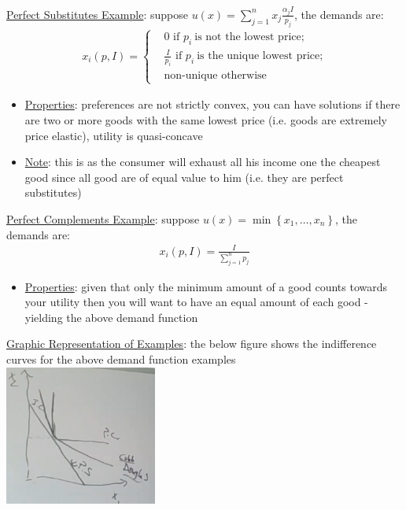 \documentclass{article}
\begin{document}
  \par
  \underline{Perfect Substitutes Example}: suppose $u(x) = \sum_{j=1}^{n}  x_{j}\frac{\alpha_{j}I}{p_{j}}$, the demands are:
  \begin{gather*}
    x_{i}(p,I) =
    \begin{cases}
     & 0 \text{ if } p_{i} \ \text{is not the lowest price;} \\
     & \tfrac{I}{p_{i}} \text{ if } p_{i} \ \text{is the unique lowest price;} \\
     & \text{non-unique otherwise}
    \end{cases}
  \end{gather*}
  \par
  \begin{itemize}
    \item  \underline{Properties}: preferences are not strictly convex, you can have solutions if there are two or more goods with the same lowest price (i.e. goods are extremely price elastic), utility is quasi-concave
  \end{itemize}
  \par
  \begin{itemize}
    \item  \underline{Note}: this is as the consumer will exhaust all his income one the cheapest good since all good are of equal value to him (i.e. they are perfect substitutes)
  \end{itemize}
  \par
  \underline{Perfect Complements Example}: suppose $u(x) = \min \left\{x_{1}, \dots, x_{n} \right\}$, the demands are:
  \begin{gather*}
    x_{i}(p,I) = \frac{I}{\sum_{j=1}^{n}p_{j}}
  \end{gather*}
  \par
  \begin{itemize}
    \item  \underline{Properties}: given that only the minimum amount of a good counts towards your utility then you will want to have an equal amount of each good - yielding the above demand function
  \end{itemize}
  \underline{Graphic Representation of Examples}: the below figure shows the indifference curves for the above demand function examples \\
  \includegraphics[width=5cm, height=5 cm]{pic23}
  \par
\vspace{6mm}
\end{document}
